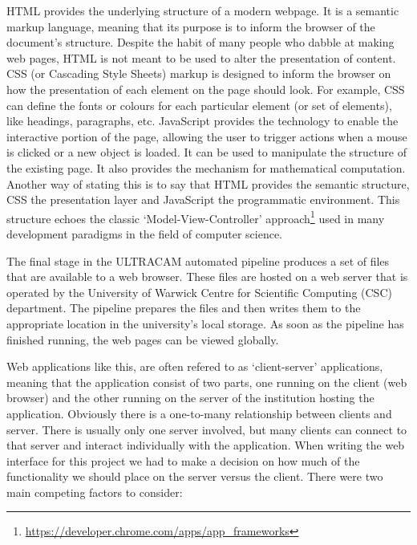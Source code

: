 HTML provides the underlying structure of a modern webpage. It is a semantic markup language, meaning that its purpose is to inform the browser of the document's structure. Despite the habit of many people who dabble at making web pages, HTML is not meant to be used to alter the presentation of content. CSS (or Cascading Style Sheets) markup is designed to inform the browser on how the presentation of each element on the page should look. For example, CSS can define the fonts or colours for each particular element (or set of elements), like headings, paragraphs, etc. JavaScript provides the technology to enable the interactive portion of the page, allowing the user to trigger actions when a mouse is clicked or a new object is loaded. It can be used to manipulate the structure of the existing page. It also provides the mechanism for mathematical computation. Another way of stating this is to say that HTML provides the semantic structure, CSS the presentation layer and JavaScript the programmatic environment. This structure echoes the classic `Model-View-Controller' approach\footnote{\url{https://developer.chrome.com/apps/app_frameworks}} used in many development paradigms in the field of computer science.

The final stage in the ULTRACAM automated pipeline produces a set of files that are available to a web browser. These files are hosted on a web server that is operated by the University of Warwick Centre for Scientific Computing (CSC) department. The pipeline prepares the files and then writes them to the appropriate location in the university's local storage. As soon as the pipeline has finished running, the web pages can be viewed globally. 

\label{sect:clientserver}
Web applications like this, are often refered to as `client-server' applications, meaning that the application consist of two parts, one running on the client (web browser) and the other running on the server of the institution hosting the application. Obviously there is a one-to-many relationship between clients and server. There is usually only one server involved, but many clients can connect to that server and interact individually with the application. When writing the web interface for this project we had to make a decision on how much of the functionality we should place on the server versus the client. There were two main competing factors to consider:

